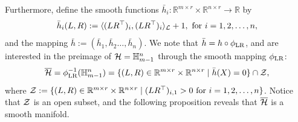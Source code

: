 Furthermore, define the smooth functions $\bar{h}_i:\mathbb{R}^{m\times r}\times\mathbb{R}^{n\times r}\to\mathbb{R}$ by 
$$
\bar{h}_i(L,R):=\langle {(LR^\top)_i, (LR^\top)_i} \rangle_{\mathcal{L}} + 1,\ \text{for}\ i=1,2,\dots,n,
$$
and the mapping $\bar{h}:=(\bar{h}_1,\bar{h}_2\dots,\bar{h}_n)$. We note that $\bar{h}=h\circ\phi_{\mathrm{LR}}$, and are interested in the preimage of $\mathcal{H}=\mathbb{H}^n_{m-1}$ through the smooth mapping $\phi_{\mathrm{LR}}$:
\begin{equation}\label{eq:barH_hyperbolic}
    \overline{\mathcal{H}} = \phi_{\mathrm{LR}}^{-1}(\mathbb{H}^n_{m-1})=\{(L,R)\in\mathbb{R}^{m\times r}\times \mathbb{R}^{n\times r}\mid \bar{h}(X)=0\}\cap\mathcal{Z},
\end{equation}
where $\zanifold:=\{(L,R)\in\mbR^{m\times r}\times \mbR^{n\times r}\mid (LR^\top)_{i,1}>0\ \text{for}\ i=1,2,\ldots,n\}$. Notice that $\mathcal{Z}$ is an open subset, and the following proposition reveals that $\overline{\mathcal{H}}$ is a smooth manifold.

